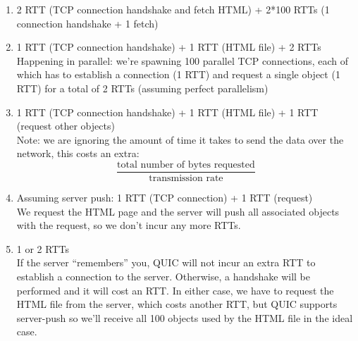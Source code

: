 \documentclass{report}
\begin{document}
\begin{problem}
\begin{answer}{40em}
  \begin{enumerate}
    \item 2 RTT (TCP connection handshake and fetch HTML) + 2*100 RTTs (1 connection handshake + 1 fetch)
    \item 1 RTT (TCP connection handshake) + 1 RTT (HTML file) + 2 RTTs\\
      Happening in parallel: we're spawning 100 parallel TCP connections, each
      of which has to establish a connection (1 RTT) and request a single
      object (1 RTT) for a total of 2 RTTs (assuming perfect parallelism)
    \item 1 RTT (TCP connection handshake) + 1 RTT (HTML file) + 1 RTT (request other objects)\\
      Note: we are ignoring the amount of time it takes to send the data over the network, this costs an extra:
      $$\frac{\text{total number of bytes requested}}{\text{transmission rate}}$$
    \item Assuming server push: 1 RTT (TCP connection) + 1 RTT (request)\\
      We request the HTML page and the server will push all associated objects
      with the request, so we don't incur any more RTTs.
    \item 1 or 2 RTTs\\
      If the server ``remembers'' you, QUIC will not incur an extra RTT to
      establish a connection to the server. Otherwise, a handshake will be
      performed and it will cost an RTT. In either case, we have to request the
      HTML file from the server, which costs another RTT, but QUIC supports
      server-push so we'll receive all 100 objects used by the HTML file in the
      ideal case.
  \end{enumerate}
\end{answer}

\end{problem}
\end{document}
